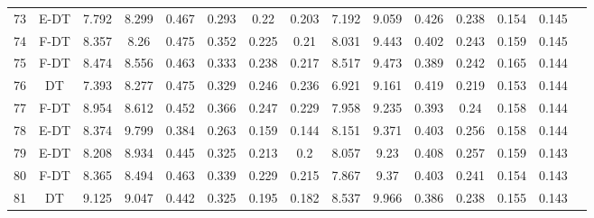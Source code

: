 \begin{longtable}{@{\hskip3pt}c@{\hskip3pt}c@{\hskip3pt}c@{\hskip3pt}c@{\hskip3pt}c@{\hskip3pt}c@{\hskip3pt}c@{\hskip3pt}c@{\hskip3pt}c@{\hskip3pt}c@{\hskip3pt}c@{\hskip3pt}c@{\hskip3pt}c@{\hskip3pt}c@{\hskip3pt}c}
         73 &           E-DT &             7.792 &          8.299 &           0.467 &           0.293 &            0.22 &           0.203 &               7.192 &           9.059 &           0.426 &         0.238 &          0.154 &           0.145 \\
         74 &           F-DT &             8.357 &           8.26 &           0.475 &           0.352 &           0.225 &            0.21 &               8.031 &           9.443 &           0.402 &         0.243 &          0.159 &           0.145 \\
         75 &           F-DT &             8.474 &          8.556 &           0.463 &           0.333 &           0.238 &           0.217 &               8.517 &           9.473 &           0.389 &         0.242 &          0.165 &           0.144 \\
         76 &             DT &             7.393 &          8.277 &           0.475 &           0.329 &           0.246 &           0.236 &               6.921 &           9.161 &           0.419 &         0.219 &          0.153 &           0.144 \\
         77 &           F-DT &             8.954 &          8.612 &           0.452 &           0.366 &           0.247 &           0.229 &               7.958 &           9.235 &           0.393 &          0.24 &          0.158 &           0.144 \\
         78 &           E-DT &             8.374 &          9.799 &           0.384 &           0.263 &           0.159 &           0.144 &               8.151 &           9.371 &           0.403 &         0.256 &          0.158 &           0.144 \\
         79 &           E-DT &             8.208 &          8.934 &           0.445 &           0.325 &           0.213 &             0.2 &               8.057 &            9.23 &           0.408 &         0.257 &          0.159 &           0.143 \\
         80 &           F-DT &             8.365 &          8.494 &           0.463 &           0.339 &           0.229 &           0.215 &               7.867 &            9.37 &           0.403 &         0.241 &          0.154 &           0.143 \\
         81 &             DT &             9.125 &          9.047 &           0.442 &           0.325 &           0.195 &           0.182 &               8.537 &           9.966 &           0.386 &         0.238 &          0.155 &           0.143 \\

\end{longtable}
